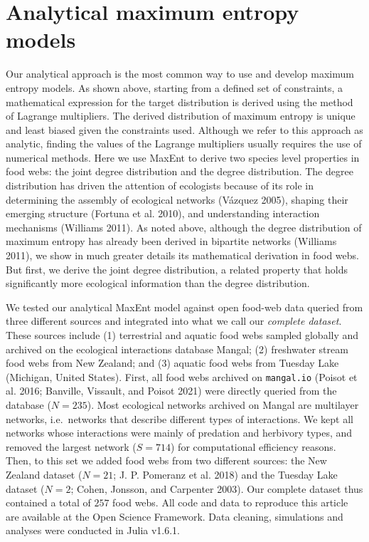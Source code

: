 \documentclass[11pt]{article}
\begin{document}
\hypertarget{analytical-maximum-entropy-models}{%
\section{Analytical maximum entropy
models}\label{analytical-maximum-entropy-models}}

Our analytical approach is the most common way to use and develop
maximum entropy models. As shown above, starting from a defined set of
constraints, a mathematical expression for the target distribution is
derived using the method of Lagrange multipliers. The derived
distribution of maximum entropy is unique and least biased given the
constraints used. Although we refer to this approach as analytic,
finding the values of the Lagrange multipliers usually requires the use
of numerical methods. Here we use MaxEnt to derive two species level
properties in food webs: the joint degree distribution and the degree
distribution. The degree distribution has driven the attention of
ecologists because of its role in determining the assembly of ecological
networks (Vázquez 2005), shaping their emerging structure (Fortuna et
al. 2010), and understanding interaction mechanisms (Williams 2011). As
noted above, although the degree distribution of maximum entropy has
already been derived in bipartite networks (Williams 2011), we show in
much greater details its mathematical derivation in food webs. But
first, we derive the joint degree distribution, a related property that
holds significantly more ecological information than the degree
distribution.

We tested our analytical MaxEnt model against open food-web data queried
from three different sources and integrated into what we call our
\emph{complete dataset}. These sources include (1) terrestrial and
aquatic food webs sampled globally and archived on the ecological
interactions database Mangal; (2) freshwater stream food webs from New
Zealand; and (3) aquatic food webs from Tuesday Lake (Michigan, United
States). First, all food webs archived on \texttt{mangal.io} (Poisot et
al. 2016; Banville, Vissault, and Poisot 2021) were directly queried
from the database (\(N = 235\)). Most ecological networks archived on
Mangal are multilayer networks, i.e.~networks that describe different
types of interactions. We kept all networks whose interactions were
mainly of predation and herbivory types, and removed the largest network
(\(S = 714\)) for computational efficiency reasons. Then, to this set we
added food webs from two different sources: the New Zealand dataset
(\(N = 21\); J. P. Pomeranz et al. 2018) and the Tuesday Lake dataset
(\(N = 2\); Cohen, Jonsson, and Carpenter 2003). Our complete dataset
thus contained a total of \(257\) food webs. All code and data to
reproduce this article are available at the Open Science Framework. Data
cleaning, simulations and analyses were conducted in Julia v1.6.1.
\end{document}
